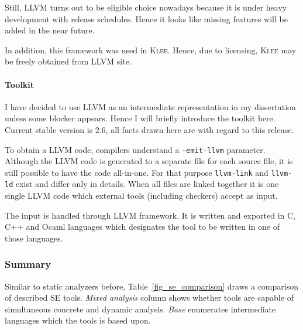 \documentclass[11pt,a4paper]{article}
\begin{document}
Still, LLVM turns out to be eligible choice nowadays because it is under heavy
development with release schedules. Hence it looks like missing features will
be added in the near future.

In addition, this framework was used in \textsc{Klee}. Hence, due to
licensing, \textsc{Klee} may be freely obtained from LLVM site.

\paragraph{Toolkit} I have decided to use LLVM as an intermediate
representation in my dissertation unless some blocker appears. Hence I will
briefly introduce the toolkit here. Current stable version is 2.6, all facts
drawn here are with regard to this release.

To obtain a LLVM code, compilers understand a \texttt{--emit-llvm} parameter.
Although the LLVM code is generated to a separate file for each source file,
it is still possible to have the code all-in-one. For that purpose
\texttt{llvm-link} and \texttt{llvm-ld} exist and differ only in details.
When all files are linked together it is one single LLVM code which external
tools (including checkers) accept as input.

The input is handled through LLVM framework. It is written and exported in C,
C++ and Ocaml languages which designates the tool to be written in one of
those languages.

\subsubsection{Summary}
Similar to static analyzers before, Table~\ref{fig_se_comparison} draws a
comparison of described SE tools. \emph{Mixed analysis} column shows whether
tools are capable of simultaneous concrete and dynamic analysis. \emph{Base}
enumerates intermediate languages which the tools is based upon.
\end{document}
